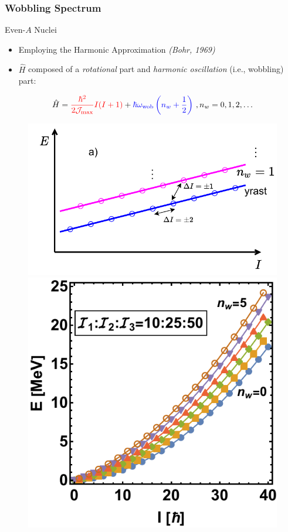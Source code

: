 \documentclass{beamer}
\begin{document}
\begin{frame}
  \frametitle{Wobbling Spectrum}
\begin{block}{Even-$A$ Nuclei}
  \begin{itemize}
    \item Employing the Harmonic Approximation \textit{(Bohr, 1969)}
    \item $\hat{H}$ composed of a {\color{red}\emph{rotational}} part and {\color{blue}\emph{harmonic oscillation}} (i.e., wobbling) part:
  \end{itemize}
  \begin{align}
    \hat{H}={\color{red}\frac{\hbar^2}{2\mathcal{J}_\text{max}}I(I+1)}+{\color{blue}\hbar\omega_\text{wob}\left(n_w+\frac{1}{2}\right)}\ , n_w=0,1,2,\dots
    \label{wobbling-hamiltonian-even-A}
  \end{align}
\end{block}
\begin{figure}
  \includegraphics[scale=0.5]{Figs/wobbling_n_schematic-1.pdf}
  \includegraphics[scale=0.4]{Figs/wobblingFreq-evenA.pdf}
\end{figure}
\end{frame}

\end{document}
